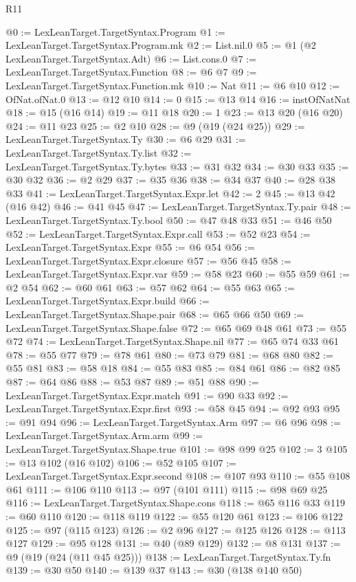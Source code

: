 \begin{lexlean}{R11}
\begin{coremodule}
@0 := LexLeanTarget.TargetSyntax.Program
@1 := LexLeanTarget.TargetSyntax.Program.mk
@2 := List.nil.{0}
@5 := @1 (@2 LexLeanTarget.TargetSyntax.Adt)
@6 := List.cons.{0}
@7 := LexLeanTarget.TargetSyntax.Function
@8 := @6 @7
@9 := LexLeanTarget.TargetSyntax.Function.mk
@10 := Nat
@11 := @6 @10
@12 := OfNat.ofNat.{0}
@13 := @12 @10
@14 := 0
@15 := @13 @14
@16 := instOfNatNat
@18 := @15 (@16 @14)
@19 := @11 @18
@20 := 1
@23 := @13 @20 (@16 @20)
@24 := @11 @23
@25 := @2 @10
@28 := @9 (@19 (@24 @25))
@29 := LexLeanTarget.TargetSyntax.Ty
@30 := @6 @29
@31 := LexLeanTarget.TargetSyntax.Ty.list
@32 := LexLeanTarget.TargetSyntax.Ty.bytes
@33 := @31 @32
@34 := @30 @33
@35 := @30 @32
@36 := @2 @29
@37 := @35 @36
@38 := @34 @37
@40 := @28 @38 @33
@41 := LexLeanTarget.TargetSyntax.Expr.let
@42 := 2
@45 := @13 @42 (@16 @42)
@46 := @41 @45
@47 := LexLeanTarget.TargetSyntax.Ty.pair
@48 := LexLeanTarget.TargetSyntax.Ty.bool
@50 := @47 @48 @33
@51 := @46 @50
@52 := LexLeanTarget.TargetSyntax.Expr.call
@53 := @52 @23
@54 := LexLeanTarget.TargetSyntax.Expr
@55 := @6 @54
@56 := LexLeanTarget.TargetSyntax.Expr.closure
@57 := @56 @45
@58 := LexLeanTarget.TargetSyntax.Expr.var
@59 := @58 @23
@60 := @55 @59
@61 := @2 @54
@62 := @60 @61
@63 := @57 @62
@64 := @55 @63
@65 := LexLeanTarget.TargetSyntax.Expr.build
@66 := LexLeanTarget.TargetSyntax.Shape.pair
@68 := @65 @66 @50
@69 := LexLeanTarget.TargetSyntax.Shape.false
@72 := @65 @69 @48 @61
@73 := @55 @72
@74 := LexLeanTarget.TargetSyntax.Shape.nil
@77 := @65 @74 @33 @61
@78 := @55 @77
@79 := @78 @61
@80 := @73 @79
@81 := @68 @80
@82 := @55 @81
@83 := @58 @18
@84 := @55 @83
@85 := @84 @61
@86 := @82 @85
@87 := @64 @86
@88 := @53 @87
@89 := @51 @88
@90 := LexLeanTarget.TargetSyntax.Expr.match
@91 := @90 @33
@92 := LexLeanTarget.TargetSyntax.Expr.first
@93 := @58 @45
@94 := @92 @93
@95 := @91 @94
@96 := LexLeanTarget.TargetSyntax.Arm
@97 := @6 @96
@98 := LexLeanTarget.TargetSyntax.Arm.arm
@99 := LexLeanTarget.TargetSyntax.Shape.true
@101 := @98 @99 @25
@102 := 3
@105 := @13 @102 (@16 @102)
@106 := @52 @105
@107 := LexLeanTarget.TargetSyntax.Expr.second
@108 := @107 @93
@110 := @55 @108 @61
@111 := @106 @110
@113 := @97 (@101 @111)
@115 := @98 @69 @25
@116 := LexLeanTarget.TargetSyntax.Shape.cons
@118 := @65 @116 @33
@119 := @60 @110
@120 := @118 @119
@122 := @55 @120 @61
@123 := @106 @122
@125 := @97 (@115 @123)
@126 := @2 @96
@127 := @125 @126
@128 := @113 @127
@129 := @95 @128
@131 := @40 (@89 @129)
@132 := @8 @131
@137 := @9 (@19 (@24 (@11 @45 @25)))
@138 := LexLeanTarget.TargetSyntax.Ty.fn
@139 := @30 @50
@140 := @139 @37
@143 := @30 (@138 @140 @50)

\end{coremodule}
\end{lexlean}
